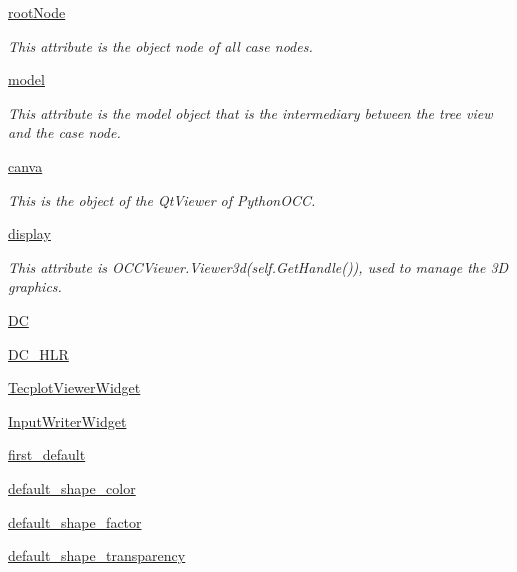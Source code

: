 \begin{DoxyCompactItemize}
\hyperlink{class_core_1_1_blade_py_core_a3cbd742c4a4a706d44d5265e19b25aaa}{root\+Node}
\begin{DoxyCompactList}\small\item\em This attribute is the object node of all case nodes. \end{DoxyCompactList}\item 
\hyperlink{class_core_1_1_blade_py_core_ac74bebda7bd9e99df8e5d26c0b61e0bb}{model}
\begin{DoxyCompactList}\small\item\em This attribute is the model object that is the intermediary between the tree view and the case node. \end{DoxyCompactList}\item 
\hyperlink{class_core_1_1_blade_py_core_ab277fbfb8af6b2ef9aff8d06c9f5cc82}{canva}
\begin{DoxyCompactList}\small\item\em This is the object of the Qt\+Viewer of Python\+O\+CC. \end{DoxyCompactList}\item 
\hyperlink{class_core_1_1_blade_py_core_abe828f3ea500c70a4abe0f376b6d8dc4}{display}
\begin{DoxyCompactList}\small\item\em This attribute is O\+C\+C\+Viewer.\+Viewer3d(self.\+Get\+Handle()), used to manage the 3D graphics. \end{DoxyCompactList}\item 
\hyperlink{class_core_1_1_blade_py_core_a8d53bb9fe024d3235652a6233d0d61a8}{DC}
\item 
\hyperlink{class_core_1_1_blade_py_core_a62af2479e8c1b0d3405a6122ea2be116}{D\+C\+\_\+\+H\+LR}
\item 
\hyperlink{class_core_1_1_blade_py_core_a04f16a810669c721b389767d47c08c8f}{Tecplot\+Viewer\+Widget}
\item 
\hyperlink{class_core_1_1_blade_py_core_a4ead2c1cc874da56fad290cca0630fc0}{Input\+Writer\+Widget}
\item 
\hyperlink{class_core_1_1_blade_py_core_af0ce94ff8ed058ada4057b3062de1d0d}{first\+\_\+default}
\item 
\hyperlink{class_core_1_1_blade_py_core_a74bd4997b68dd3f273e5eb6cbbbac70a}{default\+\_\+shape\+\_\+color}
\item 
\hyperlink{class_core_1_1_blade_py_core_aafff31611ea2a5eb584f2550607e3e23}{default\+\_\+shape\+\_\+factor}
\item 
\hyperlink{class_core_1_1_blade_py_core_a26accbeb5266ec3f792c86cf8643f696}{default\+\_\+shape\+\_\+transparency}
\end{DoxyCompactItemize}


